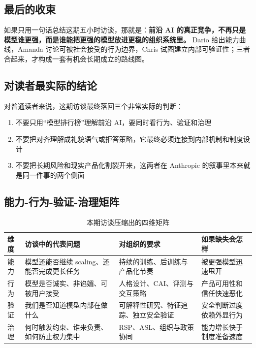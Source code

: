 \subsection{最后的收束}

如果只用一句话总结这期五小时访谈，那就是：\textbf{前沿 AI 的真正竞争，不再只是模型谁更强，而是谁能把更强的模型放进更稳的组织系统里。} Dario 给出能力曲线，Amanda 讨论可被社会接受的行为边界，Chris 试图建立内部可验证性；三者合起来，才构成一套有机会长期成立的路线图。

\subsection{对读者最实际的结论}

对普通读者来说，这期访谈最终落回三个非常实际的判断：

\begin{enumerate}
    \item 不要只用``模型排行榜''理解前沿 AI，要同时看行为、验证和治理
    \item 不要把对齐理解成礼貌语气或拒答策略，它最终必须连接到内部机制和制度设计
    \item 不要把长期风险和现实产品化割裂开来，这两者在 Anthropic 的叙事里本来就是同一件事的两个侧面
\end{enumerate}

\subsection{能力-行为-验证-治理矩阵}

\begin{table}[H]
\centering
\begin{tabular}{p{} p{} p{} p{}}
\toprule
维度 & 访谈中的代表问题 & 对组织的要求 & 如果缺失会怎样 \\
\midrule
能力 & 模型还能否继续 scaling、还能否完成更长任务 & 持续的训练、后训练与产品化节奏 & 被更强模型迅速甩开 \\
行为 & 模型是否诚实、非谄媚、可被用户接受 & 人格设计、CAI、评测与交互策略 & 产品可用性和信任快速恶化 \\
验证 & 我们是否知道模型内部在做什么 & 可解释性研究、特征追踪、独立安全验证 & 安全判断过度依赖外显行为 \\
治理 & 何时触发约束、谁来负责、如何防止权力集中 & RSP、ASL、组织与政策协同 & 能力增长快于制度准备速度 \\
\bottomrule
\end{tabular}
\caption{本期访谈压缩出的四维矩阵}
\end{table}

